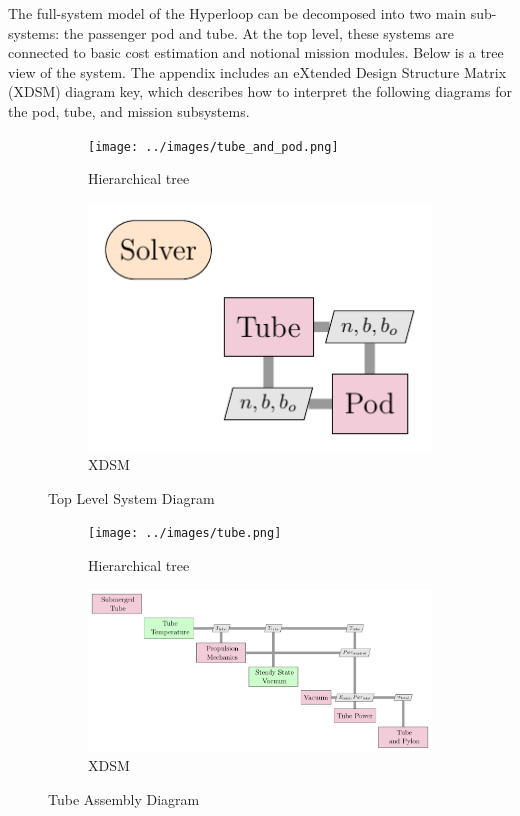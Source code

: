The full-system model of the Hyperloop can be decomposed into two main
sub-systems: the passenger pod and tube. At the top level, these systems are
connected to basic cost estimation and notional
mission modules. Below is a tree view of the system.
The appendix includes an eXtended Design Structure Matrix (XDSM) diagram key,
which describes how to interpret the following diagrams for the pod, tube, and mission subsystems.

\begin{figure}
\centering
\begin{subfigure}[t]{.4\textwidth}
  \centering
  \texttt{[image: ../images/tube\_and\_pod.png]}
  \caption{Hierarchical tree}
  \label{fig:tree:tube_and_pod}
\end{subfigure}%
\begin{subfigure}[t]{.6\textwidth}
  \centering
  \includegraphics[width=1.0\textwidth]{../images/xdsm/tube_and_pod.pdf}
  \caption{XDSM}
  \label{fig:xdsm:toplevel}
\end{subfigure}
\caption{Top Level System Diagram}
\label{fig:top}
\end{figure}

\begin{figure}
\centering
\begin{subfigure}[t]{.5\textwidth}
  \centering
  \texttt{[image: ../images/tube.png]}
  \caption{Hierarchical tree}
  \label{fig:tree:tube}
\end{subfigure}%
\begin{subfigure}[t]{.5\textwidth}
  \centering
  \includegraphics{../images/xdsm/tube.pdf}
  \caption{XDSM}
  \label{fig:xdsm:tube}
\end{subfigure}
\caption{Tube Assembly Diagram}
\label{fig:tube}
\end{figure}

